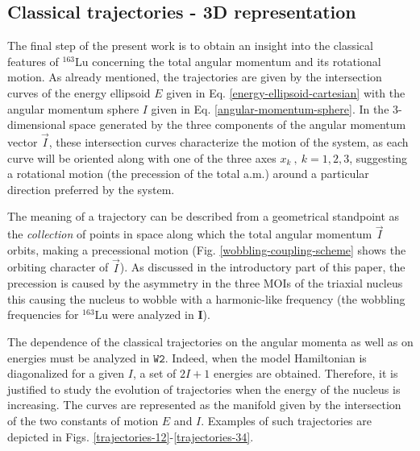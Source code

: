\documentclass[myclassdoc,debug]{rjparticle}
\begin{document}
\subsection{Classical trajectories - 3D representation}\label{classical-trajectories}

The final step of the present work is to obtain an insight into the classical features of $^{163}$Lu concerning the total angular momentum and its rotational motion. As already mentioned, the trajectories are given by the intersection curves of the energy ellipsoid $E$ given in Eq. \ref{energy-ellipsoid-cartesian} with the angular momentum sphere $I$ given in Eq. \ref{angular-momentum-sphere}. In the 3-dimensional space generated by the three components of the angular momentum vector $\vec{I}$, these intersection curves characterize the motion of the system, as each curve will be oriented along with one of the three axes $x_k\ ,\ k=1,2,3$, suggesting a rotational motion (the precession of the total a.m.) around a particular direction preferred by the system. 

The meaning of a trajectory can be described from a geometrical standpoint as the \emph{collection} of points in space along which the total angular momentum $\vec{I}$ orbits, making a precessional motion (Fig. \ref{wobbling-coupling-scheme} shows the orbiting character of $\vec{I}$). As discussed in the introductory part of this paper, the precession is caused by the asymmetry in the three MOIs of the triaxial nucleus this causing the nucleus to wobble with a harmonic-like frequency (the wobbling frequencies for $^{163}$Lu were analyzed in \textbf{I}).

The dependence of the classical trajectories on the angular momenta as well as on energies must be analyzed in $\texttt{W2}$. Indeed, when the model Hamiltonian is diagonalized for a given $I$, a set of $2I+1$ energies are obtained. Therefore, it is justified to study the evolution of trajectories when the energy of the nucleus is increasing. The curves are represented as the manifold given by the intersection of the two constants of motion $E$ and $I$. Examples of such trajectories are depicted in Figs. \ref{trajectories-12}-\ref{trajectories-34}.
\end{document}
